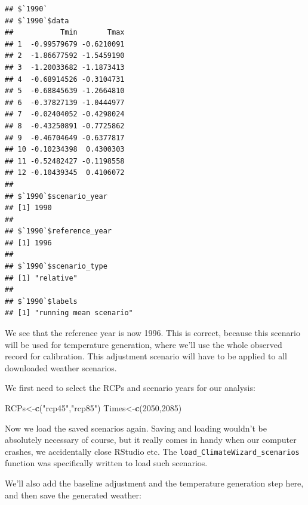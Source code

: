 \documentclass[
]{book}
\newenvironment{Shaded}{\begin{snugshade}}{\end{snugshade}}
\newcommand{\DecValTok}[1]{\textcolor[rgb]{0.00,0.00,0.81}{#1}}
\newcommand{\KeywordTok}[1]{\textcolor[rgb]{0.13,0.29,0.53}{\textbf{#1}}}
\newcommand{\NormalTok}[1]{#1}
\newcommand{\StringTok}[1]{\textcolor[rgb]{0.31,0.60,0.02}{#1}}
\begin{document}
\begin{verbatim}
## $`1990`
## $`1990`$data
##           Tmin       Tmax
## 1  -0.99579679 -0.6210091
## 2  -1.86677592 -1.5459190
## 3  -1.20033682 -1.1873413
## 4  -0.68914526 -0.3104731
## 5  -0.68845639 -1.2664810
## 6  -0.37827139 -1.0444977
## 7  -0.02404052 -0.4298024
## 8  -0.43250891 -0.7725862
## 9  -0.46704649 -0.6377817
## 10 -0.10234398  0.4300303
## 11 -0.52482427 -0.1198558
## 12 -0.10439345  0.4106072
## 
## $`1990`$scenario_year
## [1] 1990
## 
## $`1990`$reference_year
## [1] 1996
## 
## $`1990`$scenario_type
## [1] "relative"
## 
## $`1990`$labels
## [1] "running mean scenario"
\end{verbatim}

We see that the reference year is now 1996. This is correct, because this scenario will be used for temperature generation, where we'll use the whole observed record for calibration. This adjustment scenario will have to be applied to all downloaded weather scenarios.

We first need to select the RCPs and scenario years for our analysis:

\begin{Shaded}
\begin{Highlighting}[]
\NormalTok{RCPs<-}\KeywordTok{c}\NormalTok{(}\StringTok{"rcp45"}\NormalTok{,}\StringTok{"rcp85"}\NormalTok{)}
\NormalTok{Times<-}\KeywordTok{c}\NormalTok{(}\DecValTok{2050}\NormalTok{,}\DecValTok{2085}\NormalTok{)}
\end{Highlighting}
\end{Shaded}

Now we load the saved scenarios again. Saving and loading wouldn't be absolutely necessary of course, but it really comes in handy when our computer crashes, we accidentally close RStudio etc. The \texttt{load\_ClimateWizard\_scenarios} function was specifically written to load such scenarios.

We'll also add the baseline adjustment and the temperature generation step here, and then save the generated weather:
\end{document}
